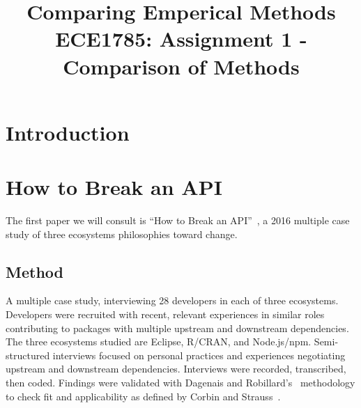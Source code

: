 \documentclass[conference]{IEEEtran}
\begin{document}
\title{Comparing Emperical Methods\\
{\small ECE1785: Assignment 1 - Comparison of Methods}}

\author{
    \and
    \and
}

\maketitle

\begin{abstract}

\end{abstract}

\section{Introduction}

\section{How to Break an API}

The first paper we will consult is ``How to Break an API''~\cite{bogart2016break}, a 2016 multiple case study of three ecosystems philosophies toward change.

\subsection{Method}

A multiple case study, interviewing 28 developers in each of three ecosystems. Developers were recruited with recent, relevant experiences in similar roles contributing to packages with multiple upstream and downstream dependencies.
The three ecosystems studied are Eclipse, R/CRAN, and Node.js/npm.
Semi-structured interviews focused on personal practices and experiences negotiating upstream and downstream dependencies.
Interviews were recorded, transcribed, then coded.
Findings were validated with Dagenais and Robillard's~\cite{dagenais2010creating} methodology to check fit and applicability as defined by Corbin and Strauss~\cite{corbin2014basics}.
\end{document}
